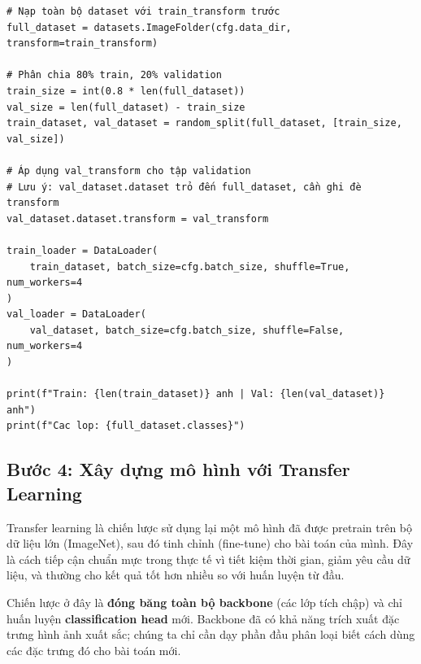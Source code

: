 \begin{verbatim}
# Nạp toàn bộ dataset với train_transform trước
full_dataset = datasets.ImageFolder(cfg.data_dir, transform=train_transform)

# Phân chia 80% train, 20% validation
train_size = int(0.8 * len(full_dataset))
val_size = len(full_dataset) - train_size
train_dataset, val_dataset = random_split(full_dataset, [train_size, val_size])

# Áp dụng val_transform cho tập validation
# Lưu ý: val_dataset.dataset trỏ đến full_dataset, cần ghi đè transform
val_dataset.dataset.transform = val_transform

train_loader = DataLoader(
    train_dataset, batch_size=cfg.batch_size, shuffle=True, num_workers=4
)
val_loader = DataLoader(
    val_dataset, batch_size=cfg.batch_size, shuffle=False, num_workers=4
)

print(f"Train: {len(train_dataset)} anh | Val: {len(val_dataset)} anh")
print(f"Cac lop: {full_dataset.classes}")
\end{verbatim}

\subsection{Bước 4: Xây dựng mô hình với Transfer Learning}
\label{subsec:cls_model}

Transfer learning là chiến lược sử dụng lại một mô hình đã được pretrain trên bộ dữ liệu lớn (ImageNet), sau đó tinh chỉnh (fine-tune) cho bài toán của mình. Đây là cách tiếp cận chuẩn mực trong thực tế vì tiết kiệm thời gian, giảm yêu cầu dữ liệu, và thường cho kết quả tốt hơn nhiều so với huấn luyện từ đầu.

Chiến lược ở đây là \textbf{đóng băng toàn bộ backbone} (các lớp tích chập) và chỉ huấn luyện \textbf{classification head} mới. Backbone đã có khả năng trích xuất đặc trưng hình ảnh xuất sắc; chúng ta chỉ cần dạy phần đầu phân loại biết cách dùng các đặc trưng đó cho bài toán mới.

